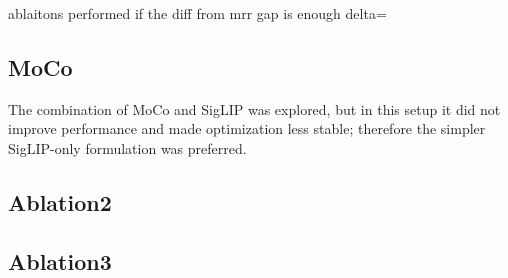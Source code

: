 ablaitons performed
if the diff from mrr gap is enough delta=

\subsection{MoCo}
The combination of MoCo and SigLIP was explored, but in this setup it did not improve performance and made optimization less stable; therefore the simpler SigLIP-only formulation was preferred.

\subsection{Ablation2}

\subsection{Ablation3}